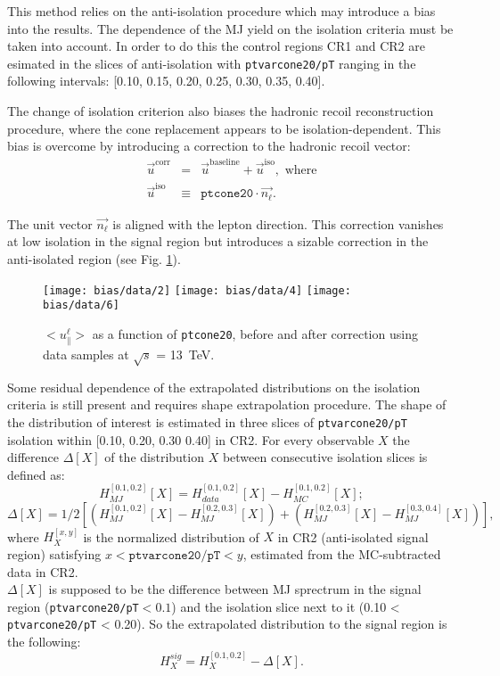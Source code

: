  This method relies on the anti-isolation procedure which may introduce a bias into the results. The dependence of the MJ yield on the isolation criteria must be taken into account. In order to do this the control regions CR1 and CR2 are esimated in the slices of anti-isolation with \texttt{ptvarcone20/pT} ranging in the following intervals: [0.10, 0.15, 0.20, 0.25, 0.30, 0.35, 0.40].
 
 The change of isolation criterion also biases the hadronic recoil reconstruction procedure, where the cone replacement appears to be isolation-dependent. This bias is overcome by introducing a correction to the hadronic recoil vector:
 \begin{eqnarray}
 \vec{u}^\text{corr} &=& \vec{u}^\text{baseline} + \vec{u}^\text{iso}, \text{ where}\\
 \vec{u}^\text{iso} &\equiv& \texttt{ptcone20} \cdot \vec{n_\ell}.
 \end{eqnarray}
 
 The unit vector $\vec{n_\ell}$ is aligned with the lepton direction. This correction vanishes at low isolation in the signal region but introduces a sizable correction in the anti-isolated region (see Fig. \ref{fig:calib_upar}).
 \begin{figure}
 	\centering
 	\texttt{[image: bias/data/2]}
 	\texttt{[image: bias/data/4]}
 	\texttt{[image: bias/data/6]}
 	\caption{$<u_\parallel^\ell>$ as a function of \texttt{ptcone20}, before and after correction using data samples at $\sqrt{s}$ = 13~TeV.}
 	\label{fig:calib_upar}
 \end{figure}
Some residual dependence of the extrapolated distributions on the isolation criteria is still present and requires shape extrapolation procedure. The shape of the distribution of interest is estimated in three slices of \texttt{ptvarcone20/pT} isolation within [0.10, 0.20, 0.30 0.40] in CR2. For every observable $X$ the difference $\Delta[X]$ of the distribution $X$ between consecutive isolation slices is defined as:
\begin{equation}
H_{MJ}^{[0.1,0.2]}[X] = H_{data}^{[0.1,0.2]}[X] - H_{MC}^{[0.1,0.2]}[X]; 
\end{equation}
\begin{equation}
\Delta[X]= 1/2 \left[ (H_{MJ}^{[0.1,0.2]}[X]-H_{MJ}^{[0.2,0.3]}[X]) + (H_{MJ}^{[0.2,0.3]}[X]-H_{MJ}^{[0.3,0.4]}[X]) \right],
\end{equation}
where $H_{X}^{[x,y]}$ is the normalized distribution of $X$ in CR2 (anti-isolated signal region) satisfying $x < \texttt{ptvarcone20/pT} < y$, estimated from the MC-subtracted data in CR2.\\
$\Delta[X]$ is supposed to be the difference between MJ sprectrum in the signal region (\texttt{ptvarcone20/pT}$<0.1$)  and the isolation slice next to it (0.10 < \texttt{ptvarcone20/pT} < 0.20).
So the extrapolated distribution to the signal region is the following:
\begin{equation}
H_{X}^{sig} = H_{X}^{[0.1,0.2]} - \Delta[X].
\end{equation}

